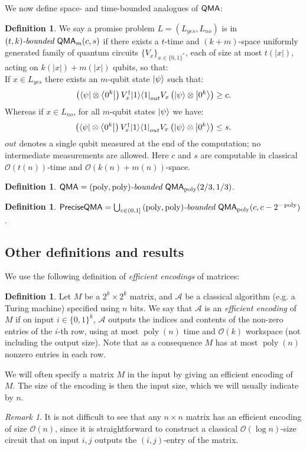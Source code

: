 \documentclass[11pt]{article}
\theoremstyle{definition}
\newtheorem{definition}[theorem]{Definition}
\theoremstyle{remark}
\newtheorem{remark}[theorem]{Remark}
\newcommand\QMA{{\sf{QMA}}}
\newcommand\preciseQMA{{\sf{PreciseQMA}}}
\newcommand\bddQMA[5]{{\left(#1,#2\right)}\textit{-bounded }\QMA_{#3}(#4,#5)}
\newcommand\bigoh{\mathcal{O}}
\DeclareMathOperator{\poly}{poly}
\begin{document}
We now define space- and time-bounded analogues of $\QMA$:
\begin{definition}We say a promise problem $L=(L_{yes},L_{no})$ is in $\bddQMA{t}{k}{m}{c}{s}$ if there exists a $t$-time and $(k+m)$-space uniformly generated family of quantum circuits $\{ V_x\}_{x\in\{0,1\}^*}$, each of size at most $t(|x|)$, acting on $k(|x|)+m(|x|)$ qubits, so that:\\

If $x \in L_{yes}$ there exists an $m$-qubit state ${\left\vert{\psi}\right\rangle}$ such that:
\begin{equation}
\left({\left\langle{\psi}\right\vert}\otimes {\left\langle{0^k}\right\vert}\right) V^\dagger_x {\left\vert{1}\right\rangle}{\left\langle{1}\right\vert}_{out} V_x \left({\left\vert{\psi}\right\rangle}\otimes {\left\vert{0^k}\right\rangle}\right) \ge c.
\end{equation}
Whereas if $x \in L_{no}$, for all $m$-qubit states ${\left\vert{\psi}\right\rangle}$ we have:
\begin{equation}
\left({\left\langle{\psi}\right\vert}\otimes {\left\langle{0^k}\right\vert}\right) V^\dagger_x {\left\vert{1}\right\rangle}{\left\langle{1}\right\vert}_{out} V_x \left({\left\vert{\psi}\right\rangle}\otimes {\left\vert{0^k}\right\rangle}\right) \le s.
\end{equation}
$out$ denotes a single qubit measured at the end of the computation; no intermediate measurements are allowed.  
Here $c$ and $s$ are computable in classical $\bigoh(t(n))$-time and $\bigoh(k(n)+m(n))$-space.
  \end{definition}

\begin{definition} $\QMA=\bddQMA{\poly}{\poly}{\poly}{2/3}{1/3}$.
\end{definition}
\begin{definition} $\preciseQMA=\bigcup_{c \in (0,1]}\bddQMA{\poly}{\poly}{\poly}{c}{c-2^{-\poly}}$.
\end{definition}

\subsection{Other definitions and results}
We use the following definition of \emph{efficient encodings} of matrices:
\begin{definition}\label{def: efficient encoding}Let $M$ be a $2^{k} \times 2^{k}$ matrix, and $\mathcal{A}$ be a classical algorithm (e.g. a Turing machine) specified using $n$ bits. We say that $\mathcal{A}$ is an \emph{efficient encoding} of $M$ if on input $i\in\{0,1\}^k$, $\mathcal{A}$ outputs the indices and contents of the non-zero entries of the $i$-th row, using at most $\poly(n)$ time and $\bigoh(k)$ workspace (not including the output size). Note that as a consequence $M$ has at most $\poly(n)$ nonzero entries in each row.
\end{definition}
We will often specify a matrix $M$ in the input by giving an efficient encoding of $M$. The size of the encoding is then the input size, which we will usually indicate by $n$. 
\begin{remark} \label{rem:logspace}
It is not difficult to see that any $n \times n$ matrix has an efficient encoding of size $\bigoh(n)$, since it is straightforward to construct a classical $\bigoh(\log n)$-size circuit that on input $i,j$ outputs the $(i,j)$-entry of the matrix.
\end{remark}
\end{document}

